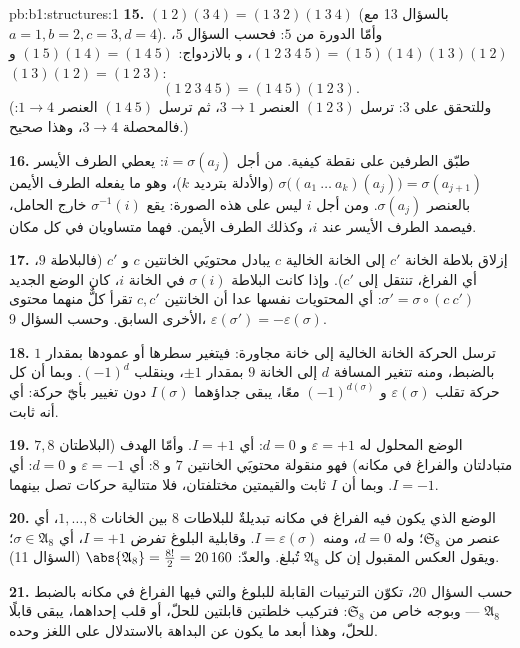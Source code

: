 \begin{solution}{pb:b1:structures:1}
\textbf{15.} $(1\ 2)(3\ 4) = (1\ 3\ 2)(1\ 3\ 4)$ (بالسؤال 13
مع $a{=}1, b{=}2, c{=}3, d{=}4$). وأمّا الدورة من  $5$: فحسب
السؤال 5، $(1\ 2\ 3\ 4\ 5) = (1\ 5)(1\ 4)(1\ 3)(1\ 2)$، و
بالازدواج: $(1\ 5)(1\ 4) = (1\ 4\ 5)$ و$(1\ 3)(1\ 2) = (1\ 2\ 3)$:
\[
(1\ 2\ 3\ 4\ 5) = (1\ 4\ 5)(1\ 2\ 3) .
\]
(وللتحقق على $3$: ترسل $(1\ 2\ 3)$ العنصر $3 \to 1$، ثم ترسل $(1\ 4\ 5)$
العنصر $1 \to 4$: فالمحصلة $3 \to 4$، وهذا صحيح.)

\textbf{16.} طبّق الطرفين على نقطة كيفية. من أجل $i =
\sigma(a_j)$: يعطي الطرف الأيسر $\sigma\bigl((a_1\ \dots\
a_k)(a_j)\bigr) = \sigma(a_{j+1})$ (والأدلة بترديد $k$)، وهو ما
يفعله الطرف الأيمن بالعنصر $\sigma(a_j)$. ومن أجل $i$ ليس على هذه
الصورة: يقع $\sigma^{-1}(i)$ خارج الحامل، فيصمد الطرف الأيسر
عند $i$، وكذلك الطرف الأيمن. فهما متساويان في كل مكان.

\textbf{17.} إزلاق بلاطة الخانة $c'$ إلى الخانة الخالية
$c$ يبادل محتويَي الخانتين $c$ و $c'$ (فالبلاطة $9$، أي
الفراغ، تنتقل إلى $c'$). وإذا كانت البلاطة $\sigma(i)$ في الخانة $i$، كان
الوضع الجديد $\sigma' = \sigma \circ (c\ c')$: أي المحتويات نفسها
عدا أن الخانتين $c, c'$ تقرأ كلٌّ منهما محتوى الأخرى السابق. وحسب
السؤال 9، $\varepsilon(\sigma') = -\varepsilon(\sigma)$.

\textbf{18.} ترسل الحركة الخانة الخالية إلى خانة مجاورة: فيتغير
سطرها أو عمودها بمقدار $1$ بالضبط، ومنه تتغير المسافة
$d$ إلى الخانة $9$ بمقدار $\pm1$، وينقلب $(-1)^d$. وبما أن كل
حركة تقلب $\varepsilon(\sigma)$ و $(-1)^{d(\sigma)}$ معًا،
يبقى جداؤهما $I(\sigma)$ دون تغيير بأيّ حركة: أي أنه
ثابت.

\textbf{19.} الوضع المحلول له $\varepsilon = +1$ و $d = 0$:
أي $I = +1$. وأمّا الهدف (البلاطتان $7, 8$ متبادلتان والفراغ في مكانه) فهو
منقولة محتويَي الخانتين $7$ و $8$: أي $\varepsilon
= -1$ و $d = 0$: أي $I = -1$. وبما أن $I$ ثابت والقيمتين
مختلفتان، فلا متتالية حركات تصل بينهما.

\textbf{20.} الوضع الذي يكون فيه الفراغ في مكانه تبديلةٌ
للبلاطات $8$ بين الخانات $1, \dots, 8$، أي عنصر من
$\mathfrak S_8$؛ وله $d = 0$، ومنه $I = \varepsilon(\sigma)$.
وقابلية البلوغ تفرض $I = +1$، أي $\sigma \in \mathfrak A_8$؛ ويقول
العكس المقبول إن كل $\mathfrak A_8$ تُبلغ. والعدّ:
$\abs{\mathfrak A_8} = \frac{8!}2 = 20\,160$ (السؤال 11).

\textbf{21.} حسب السؤال 20، تكوّن الترتيبات القابلة للبلوغ
والتي فيها الفراغ في مكانه بالضبط $\mathfrak A_8$ --- وبوجه خاص
\emph{} من $\mathfrak S_8$: فتركيب خلطتين قابلتين للحلّ،
أو قلب إحداهما، يبقى قابلًا للحلّ، وهذا أبعد ما يكون
عن البداهة بالاستدلال على اللغز وحده.


\end{solution}
